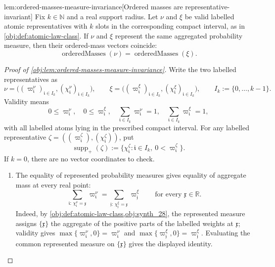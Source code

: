 \documentclass[11pt]{article}
\begin{document}
\begin{lemmav}{lem:ordered-masses-measure-invariance}[Ordered masses are representative-invariant]
Fix \(k\in\mathbb N\) and a real support radius.  Let \(\nu\) and \(\xi\) be valid labelled atomic representatives with \(k\) slots in the corresponding compact interval, as in \cref{obj:def:atomic-law-class}.  If \(\nu\) and \(\xi\) represent the same aggregated probability measure, then their ordered-mass vectors coincide:
\[
\operatorname{orderedMasses}(\nu)=\operatorname{orderedMasses}(\xi).
\]
\end{lemmav}

\begin{proof}[Proof of \cref{obj:lem:ordered-masses-measure-invariance}]
Write the two labelled representatives as
\[
\nu=\bigl((\varpi^\nu_{\mathfrak i})_{\mathfrak i\in I_k},
(\chi^\nu_{\mathfrak i})_{\mathfrak i\in I_k}\bigr),
\qquad
\xi=\bigl((\varpi^\xi_{\mathfrak i})_{\mathfrak i\in I_k},
(\chi^\xi_{\mathfrak i})_{\mathfrak i\in I_k}\bigr),
\qquad
I_k:=\{0,\ldots,k-1\}.
\]
Validity means
\[
0\le \varpi^\nu_{\mathfrak i},\quad
0\le \varpi^\xi_{\mathfrak i},\quad
\sum_{\mathfrak i\in I_k}\varpi^\nu_{\mathfrak i}=1,\quad
\sum_{\mathfrak i\in I_k}\varpi^\xi_{\mathfrak i}=1,
\]
with all labelled atoms lying in the prescribed compact interval.  For any labelled representative
\(\zeta=((\varpi^\zeta_{\mathfrak i}),(\chi^\zeta_{\mathfrak i}))\), put
\[
\operatorname{supp}_+(\zeta)
:=
\{\chi^\zeta_{\mathfrak i}:\mathfrak i\in I_k,\ 0<\varpi^\zeta_{\mathfrak i}\}.
\]
If \(k=0\), there are no vector coordinates to check.

\begin{enumerate}
\item\label{pf:ordered-masses:aggregate}
The equality of represented probability measures gives equality of aggregate mass at every real point:
\[
\sum_{\mathfrak i:\,\chi^\nu_{\mathfrak i}=\mathfrak x}\varpi^\nu_{\mathfrak i}
=
\sum_{\mathfrak j:\,\chi^\xi_{\mathfrak j}=\mathfrak x}\varpi^\xi_{\mathfrak j}
\qquad\text{for every }\mathfrak x\in\mathbb R .
\]
Indeed, by \cref{obj:def:atomic-law-class,obj:synth_28}, the represented measure assigns \(\{\mathfrak x\}\) the aggregate of the positive parts of the labelled weights at \(\mathfrak x\); validity gives \(\max\{\varpi^\nu_{\mathfrak i},0\}=\varpi^\nu_{\mathfrak i}\) and \(\max\{\varpi^\xi_{\mathfrak j},0\}=\varpi^\xi_{\mathfrak j}\).  Evaluating the common represented measure on \(\{\mathfrak x\}\) gives the displayed identity.


\end{enumerate}
\end{proof}
\end{document}
